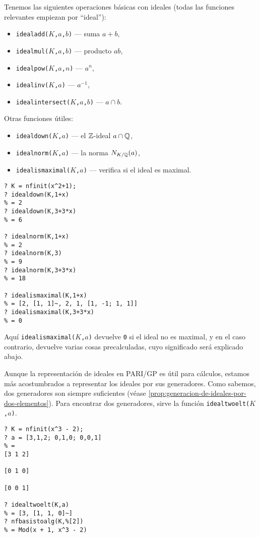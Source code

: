Tenemos las siguientes operaciones básicas con ideales (todas las funciones
relevantes empiezan por ``ideal''):
\begin{itemize}
  \item \texttt{idealadd($K$,$a$,$b$)} --- suma $a+b$,
  \item \texttt{idealmul($K$,$a$,$b$)} --- producto $ab$,
  \item \texttt{idealpow($K$,$a$,$n$)} --- $a^n$,
  \item \texttt{idealinv($K$,$a$)} --- $a^{-1}$,
  \item \texttt{idealintersect($K$,$a$,$b$)} --- $a \cap b$.
\end{itemize}
Otras funciones útiles:
\begin{itemize}
  \item \texttt{idealdown($K$,$a$)} --- el $\mathbb{Z}$-ideal $a \cap \mathbb{Q}$,
  \item \texttt{idealnorm($K$,$a$)} --- la norma $N_{K/\mathbb{Q}} (a)$,
  \item \texttt{idealismaximal($K$,$a$)} --- verifica si el ideal es maximal.
\end{itemize}

\begin{shaded}
\begin{verbatim}
? K = nfinit(x^2+1);
? idealdown(K,1+x)
% = 2
? idealdown(K,3+3*x)
% = 6

? idealnorm(K,1+x)
% = 2
? idealnorm(K,3)
% = 9
? idealnorm(K,3+3*x)
% = 18

? idealismaximal(K,1+x)
% = [2, [1, 1]~, 2, 1, [1, -1; 1, 1]]
? idealismaximal(K,3+3*x)
% = 0
\end{verbatim}
\end{shaded}

Aquí \texttt{idealismaximal($K$,$a$)} devuelve \texttt{0} si el ideal no es
maximal, y en el caso contrario, devuelve varias cosas precalculadas, cuyo
significado será explicado abajo.

Aunque la representación de ideales en PARI/GP es útil para cálculos, estamos
más acostumbrados a representar los ideales por sus generadores. Como sabemos,
dos generadores son siempre suficientes
(véase \ref{prop:generacion-de-ideales-por-dos-elementos}).
Para encontrar dos generadores, sirve la función
\texttt{idealtwoelt($K$,$a$)}.

\begin{shaded}
\begin{verbatim}
? K = nfinit(x^3 - 2);
? a = [3,1,2; 0,1,0; 0,0,1]
% = 
[3 1 2]

[0 1 0]

[0 0 1]

? idealtwoelt(K,a)
% = [3, [1, 1, 0]~]
? nfbasistoalg(K,%[2])
% = Mod(x + 1, x^3 - 2)
\end{verbatim}
\end{shaded}

